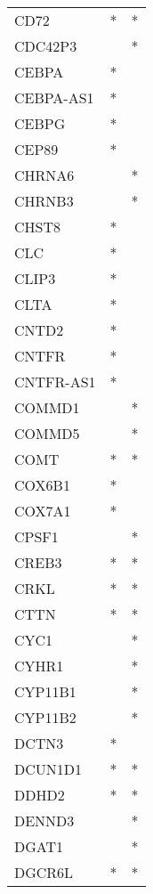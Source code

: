 \begin{longtable}{lcc}
CD72         &         * &       * \\
CDC42P3      &           &       * \\
CEBPA        &         * &         \\
CEBPA-AS1    &         * &         \\
CEBPG        &         * &         \\
CEP89        &         * &         \\
CHRNA6       &           &       * \\
CHRNB3       &           &       * \\
CHST8        &         * &         \\
CLC          &         * &         \\
CLIP3        &         * &         \\
CLTA         &         * &         \\
CNTD2        &         * &         \\
CNTFR        &         * &         \\
CNTFR-AS1    &         * &         \\
COMMD1       &           &       * \\
COMMD5       &           &       * \\
COMT         &         * &       * \\
COX6B1       &         * &         \\
COX7A1       &         * &         \\
CPSF1        &           &       * \\
CREB3        &         * &       * \\
CRKL         &         * &       * \\
CTTN         &         * &       * \\
CYC1         &           &       * \\
CYHR1        &           &       * \\
CYP11B1      &           &       * \\
CYP11B2      &           &       * \\
DCTN3        &         * &         \\
DCUN1D1      &         * &       * \\
DDHD2        &         * &       * \\
DENND3       &           &       * \\
DGAT1        &           &       * \\
DGCR6L       &         * &       * \\

\end{longtable}
